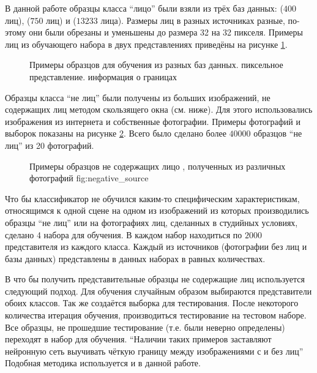 \documentclass[12pt]{report}
\begin{document}
В данной работе образцы класса ``лицо'' были взяли из трёх баз данных: \citep{samaria1994parameterisation} ($400$ 
лиц), 
\citep{GeorgiaTechFaceDatabase} ($750$ лиц) и \citep{huang2007labeled} ($13 233$ лица). Размеры лиц в разных 
источниках разные, по-этому они были  обрезаны и уменьшены до размера 32 на 32 пикселя. Примеры лиц из обучающего 
набора в двух представлениях приведёны на рисунке \ref{fig:sample_faces}.

\begin{figure}[h]
	\centering
	\caption{Примеры образцов для обучения из разных баз данных.  пиксельное представление. 
 информация о границах}
	\label{fig:sample_faces}
\end{figure}

Образцы класса ``не лиц'' были получены из больших изображений, не содержащих лиц методом скользящего окна (см. 
ниже). 
Для этого использовались изображения из интернета и собственные фотографии. Примеры фотографий и выборок показаны 
на 
рисунке \ref{fig:sample_nonfaces}. Всего было сделано более $40 000$ образцов ``не лиц'' из 20 фотографий.

\begin{figure}[h]
	\centering
	\caption{Примеры образцов не содержащих лицо , полученных из различных фотографий \subref
{fig:negative_source}}
	\label{fig:sample_nonfaces}
\end{figure}

Что бы классификатор не обучился каким-то специфическим характеристикам, относящимся к одной сцене на одном из 
изображений из которых производились образцы ``не лиц'' или на фотографиях лиц, сделанных в студийных условиях, 
сделано 4 набора для обучения. В каждом набор находиться по $2 000$ представителя из каждого класса. Каждый из 
источников (фотографии без лиц и базы данных) представлены в данных наборах в равных количествах.

В \citep{rowley1998neural} что бы получить представительные образцы не содержащие лиц используется следующий 
подход. 
Для обучения случайным образом выбираются представители обоих классов. Так же создаётся выборка для тестирования. 
После некоторого количества итерация обучения, производиться тестирование на тестовом наборе. Все образцы, не 
прошедшие тестирование (т.е. были неверно определены) переходят в набор для обучения. ``Наличии таких примеров 
заставляют нейронную сеть выучивать чёткую границу между изображениями с и без лиц'' \citep{rowley1998neural} 
Подобная методика используется и в данной работе.
\end{document}
